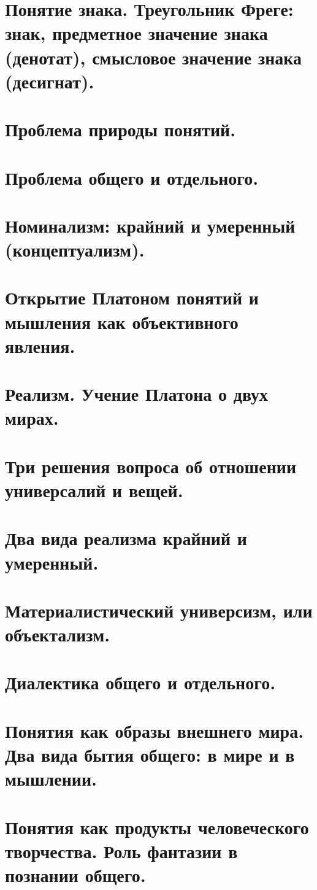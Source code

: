 \section{ Понятие знака. Треугольник Фреге: знак, предметное значение знака (денотат), смысловое значение знака (десигнат).}
\section{ Проблема природы понятий.}
\section{ Проблема общего и отдельного.}
\section{ Номинализм: крайний и умеренный (концептуализм).}
\section{ Открытие Платоном понятий и мышления как объективного явления.}
\section{ Реализм. Учение Платона о двух мирах.}
\section{ Три решения вопроса об отношении универсалий и вещей.}
\section{ Два вида реализма крайний и умеренный.}
\section{ Материалистический универсизм, или объектализм.}
\section{ Диалектика общего и отдельного.}
\section{ Понятия как образы внешнего мира. Два вида бытия общего: в мире и в мышлении.}
\section{ Понятия как продукты человеческого творчества. Роль фантазии в познании общего.}
